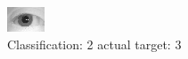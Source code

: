 \begin{figure}[h!]
\begin{center}
\includegraphics[width=0.60\columnwidth]{figures/ID1161_class_2_target_3.png}
\end{center}
\caption{ Classification: 2 actual target: 3}
\label{fig:ID1161_class_2_target_3}
\end{figure}
